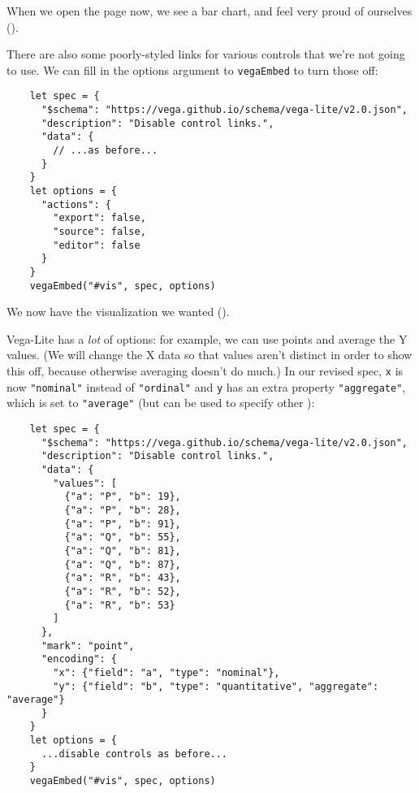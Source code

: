 When we open the page now,
we see a bar chart,
and feel very proud of ourselves
().


There are also some poorly-styled links for various controls that we're not going to use.
We can fill in the options argument to \texttt{vegaEmbed} to turn those off:

\begin{verbatim}
    let spec = {
      "$schema": "https://vega.github.io/schema/vega-lite/v2.0.json",
      "description": "Disable control links.",
      "data": {
        // ...as before...
      }
    }
    let options = {
      "actions": {
        "export": false,
        "source": false,
        "editor": false
      }
    }
    vegaEmbed("#vis", spec, options)
\end{verbatim}

\noindent
We now have the visualization we wanted
().


Vega-Lite has a \emph{lot} of options:
for example,
we can use points and average the Y values.
(We will change the X data so that values aren't distinct in order to show this off,
because otherwise averaging doesn't do much.)
In our revised spec,
\texttt{x} is now \texttt{"nominal"} instead of \texttt{"ordinal"}
and \texttt{y} has an extra property \texttt{"aggregate"},
which is set to \texttt{"average"}
(but can be used to specify other ):

\begin{verbatim}
    let spec = {
      "$schema": "https://vega.github.io/schema/vega-lite/v2.0.json",
      "description": "Disable control links.",
      "data": {
        "values": [
          {"a": "P", "b": 19},
          {"a": "P", "b": 28},
          {"a": "P", "b": 91},
          {"a": "Q", "b": 55},
          {"a": "Q", "b": 81},
          {"a": "Q", "b": 87},
          {"a": "R", "b": 43},
          {"a": "R", "b": 52},
          {"a": "R", "b": 53}
        ]
      },
      "mark": "point",
      "encoding": {
        "x": {"field": "a", "type": "nominal"},
        "y": {"field": "b", "type": "quantitative", "aggregate": "average"}
      }
    }
    let options = {
      ...disable controls as before...
    }
    vegaEmbed("#vis", spec, options)
\end{verbatim}

